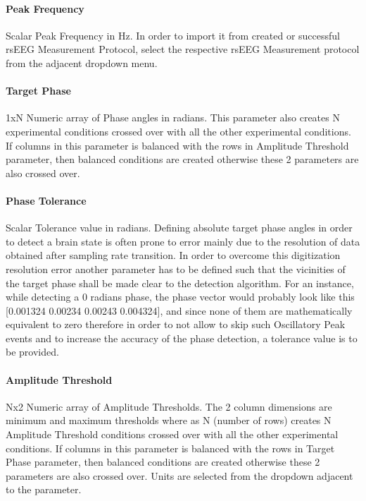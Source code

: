 \documentclass[letterpaper,10pt,english]{sphinxmanual}
\begin{document}
\paragraph{Peak Frequency}
\label{\detokenize{13_TUSIntervention:peak-frequency}}
\sphinxAtStartPar
Scalar Peak Frequency in Hz. In order to import it from created or successful rsEEG Measurement Protocol, select the respective rsEEG Measurement protocol from the adjacent dropdown menu.


\paragraph{Target Phase}
\label{\detokenize{13_TUSIntervention:target-phase}}
\sphinxAtStartPar
1xN Numeric array of Phase angles in radians. This parameter also creates N experimental conditions crossed over with all the other experimental conditions. If columns in this parameter is balanced with the rows in Amplitude Threshold parameter, then balanced conditions are created otherwise these 2 parameters are also crossed over.


\paragraph{Phase Tolerance}
\label{\detokenize{13_TUSIntervention:phase-tolerance}}
\sphinxAtStartPar
Scalar Tolerance value in radians. Defining absolute target phase angles in order to detect a brain state is often prone to error mainly due to the resolution of data obtained after sampling rate transition. In order to overcome this digitization resolution error another parameter has to be defined such that the vicinities of the target phase shall be made clear to the detection algorithm. For an instance, while detecting a 0 radians phase, the phase vector would probably look like this {[}\sphinxhyphen{}0.001324 \sphinxhyphen{}0.00234 0.00243 0.004324{]}, and since none of them are mathematically equivalent to zero therefore in order to not allow to skip such Oscillatory Peak events and to increase the accuracy of the phase detection, a tolerance value is to be provided.


\paragraph{Amplitude Threshold}
\label{\detokenize{13_TUSIntervention:amplitude-threshold}}
\sphinxAtStartPar
Nx2 Numeric array of Amplitude Thresholds. The 2 column dimensions are minimum and maximum thresholds where as N (number of rows) creates N Amplitude Threshold conditions crossed over with all the other experimental conditions. If columns in this parameter is balanced with the rows in Target Phase parameter, then balanced conditions are created otherwise these 2 parameters are also crossed over. Units are selected from the drop\sphinxhyphen{}down adjacent to the parameter.
\end{document}
